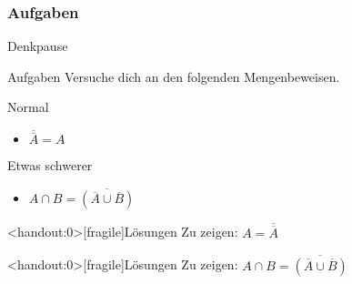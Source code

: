 \subsubsection{Aufgaben}
{
    \begin{frame}[fragile]{Denkpause}
        \begin{alertblock}{Aufgaben}
            Versuche dich an den folgenden Mengenbeweisen.
        \end{alertblock}

        \begin{block}{Normal}
            \begin{itemize}
                \item $\overline{\overline{A}} = A$
            \end{itemize}
        \end{block}
        \begin{block}{Etwas schwerer}
            \begin{itemize}
                \item $A\cap B=\overline{(\overline{A}\cup\overline{B})}$
            \end{itemize}
        \end{block}
    \end{frame}
}

{
    \begin{frame}<handout:0>[fragile]{Lösungen}
        \onslide Zu zeigen: $A=\overline{\overline{A}}$
    \end{frame}
}

{
    \begin{frame}<handout:0>[fragile]{Lösungen}
        \onslide Zu zeigen: $A \cap B=\overline{(\overline{A}\cup\overline{B})}$
    \end{frame}
}
